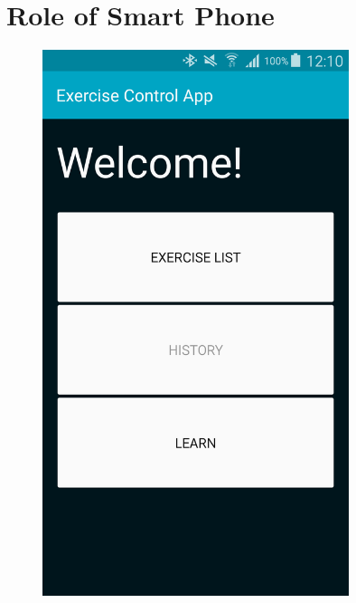 \section{Role of Smart Phone}

\begin{figure}[t!]
  \centering
    \begin{minipage}{0.25\textwidth}
      \centering
        \includegraphics[width=0.80\textwidth]{00_resources/figures/Android_Phone_MainView.png}
    \end{minipage}
    \begin{minipage}{0.25\textwidth}
      \centering

\end{minipage}
\end{figure}
